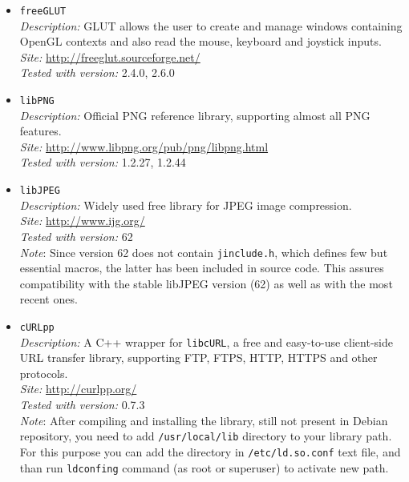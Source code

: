 \begin{itemize}

  \item \texttt{freeGLUT} \\
    \textit{Description:} \small {GLUT allows the user to create and manage
      windows containing OpenGL contexts and also read the mouse, keyboard
      and joystick inputs.} \\
    \textit{Site:} \url{http://freeglut.sourceforge.net/} \\
    \textit{Tested with version:} 2.4.0, 2.6.0

  \item \texttt{libPNG} \\
    \textit{Description:} \small {Official PNG reference library, supporting
      almost all PNG features.} \\
    \textit{Site:} \url{http://www.libpng.org/pub/png/libpng.html} \\
    \textit{Tested with version:} 1.2.27, 1.2.44

  \item \texttt{libJPEG} \\
    \textit{Description:} \small {Widely used free library for JPEG image
      compression.} \\
    \textit{Site:} \url{http://www.ijg.org/} \\
    \textit{Tested with version:} 62 \\
    \textit{Note}: \small{Since version 62 does not contain \texttt{jinclude.h},
      which defines few but essential macros, the latter has been included in
      \framework{} source code. This assures compatibility with the stable
      libJPEG version (62) as well as with the most recent ones.}

  \item \texttt{cURLpp} \\
    \textit{Description:} \small {A C++ wrapper for \texttt{libcURL}, a free and
      easy-to-use client-side URL transfer library, supporting FTP, FTPS, HTTP, HTTPS
      and other protocols.} \\
    \textit{Site:} \url{http://curlpp.org/} \\
    \textit{Tested with version:} 0.7.3 \\
    \textit{Note}: \small{After compiling and installing the library, still not present
      in Debian repository, you need to add \texttt{/usr/local/lib} directory
      to your library path. For this purpose you can add the directory in
      \texttt{/etc/ld.so.conf} text file, and than run
      \texttt{ldconfing} command (as root or superuser) to activate new path.}

\end{itemize}

